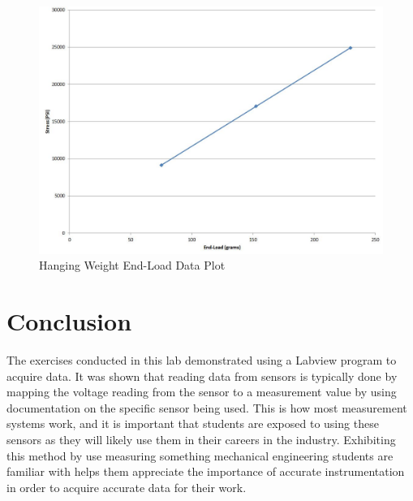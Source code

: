 \documentclass[12pt]{article}
\begin{document}
\begin{figure}[h!] %
   \centering
   \includegraphics[width=5.5in]{hanging_weight_plot.jpg} 
   \caption{Hanging Weight End-Load Data Plot}
   \label{fig:example}
\end{figure}


\section*{\fontsize{12}{12}\selectfont \large Conclusion}
The exercises conducted in this lab demonstrated using a Labview program to acquire data. It was shown that reading data from sensors is typically done by mapping the voltage reading from the sensor to a measurement value by using documentation on the specific sensor being used. This is how most measurement systems work, and it is important that students are exposed to using these sensors as they will likely use them in their careers in the industry. Exhibiting this method by use measuring something mechanical engineering students are familiar with helps them appreciate the importance of accurate instrumentation in order to acquire accurate data for their work.



%
%




\end{document}
